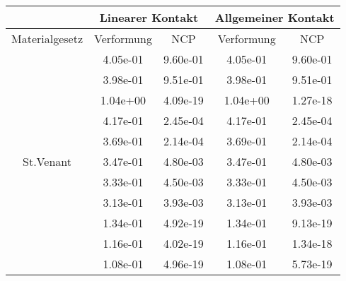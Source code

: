 \begin{table} 
\centering 
\begin{tabular}{c|cc|cc|} 
\cline{2-5} 
 & \multicolumn{2}{|c|}{Linearer Kontakt} & \multicolumn{2}{|c|}{Allgemeiner Kontakt} \\ 
\hline 
\multicolumn{1}{|c|}{Materialgesetz} & \multicolumn{1}{c|}{Verformung} & \multicolumn{1}{c|}{NCP} & \multicolumn{1}{c|}{Verformung} & \multicolumn{1}{c|}{NCP} \\ 
\hline 
\multicolumn{1}{|c|}{\multirow{16}{*}{St.Venant}} &\multicolumn{1}{|c|}{  4.05e-01} & \multicolumn{1}{|c|}{  9.60e-01} & \multicolumn{1}{|c|}{  4.05e-01} & \multicolumn{1}{|c|}{  9.60e-01} \\ 
\multicolumn{1}{|c|}{} & \multicolumn{1}{|c|}{  3.98e-01} & \multicolumn{1}{|c|}{  9.51e-01} & \multicolumn{1}{|c|}{  3.98e-01} & \multicolumn{1}{|c|}{  9.51e-01} \\ 
\multicolumn{1}{|c|}{} & \multicolumn{1}{|c|}{  1.04e+00} & \multicolumn{1}{|c|}{  4.09e-19} & \multicolumn{1}{|c|}{  1.04e+00} & \multicolumn{1}{|c|}{  1.27e-18} \\ 
\multicolumn{1}{|c|}{} & \multicolumn{1}{|c|}{  4.17e-01} & \multicolumn{1}{|c|}{  2.45e-04} & \multicolumn{1}{|c|}{  4.17e-01} & \multicolumn{1}{|c|}{  2.45e-04} \\ 
\multicolumn{1}{|c|}{} & \multicolumn{1}{|c|}{  3.69e-01} & \multicolumn{1}{|c|}{  2.14e-04} & \multicolumn{1}{|c|}{  3.69e-01} & \multicolumn{1}{|c|}{  2.14e-04} \\ 
\multicolumn{1}{|c|}{} & \multicolumn{1}{|c|}{  3.47e-01} & \multicolumn{1}{|c|}{  4.80e-03} & \multicolumn{1}{|c|}{  3.47e-01} & \multicolumn{1}{|c|}{  4.80e-03} \\ 
\multicolumn{1}{|c|}{} & \multicolumn{1}{|c|}{  3.33e-01} & \multicolumn{1}{|c|}{  4.50e-03} & \multicolumn{1}{|c|}{  3.33e-01} & \multicolumn{1}{|c|}{  4.50e-03} \\ 
\multicolumn{1}{|c|}{} & \multicolumn{1}{|c|}{  3.13e-01} & \multicolumn{1}{|c|}{  3.93e-03} & \multicolumn{1}{|c|}{  3.13e-01} & \multicolumn{1}{|c|}{  3.93e-03} \\ 
\multicolumn{1}{|c|}{} & \multicolumn{1}{|c|}{  1.34e-01} & \multicolumn{1}{|c|}{  4.92e-19} & \multicolumn{1}{|c|}{  1.34e-01} & \multicolumn{1}{|c|}{  9.13e-19} \\ 
\multicolumn{1}{|c|}{} & \multicolumn{1}{|c|}{  1.16e-01} & \multicolumn{1}{|c|}{  4.02e-19} & \multicolumn{1}{|c|}{  1.16e-01} & \multicolumn{1}{|c|}{  1.34e-18} \\ 
\multicolumn{1}{|c|}{} & \multicolumn{1}{|c|}{  1.08e-01} & \multicolumn{1}{|c|}{  4.96e-19} & \multicolumn{1}{|c|}{  1.08e-01} & \multicolumn{1}{|c|}{  5.73e-19} \\ 

\end{tabular}
\end{table}
